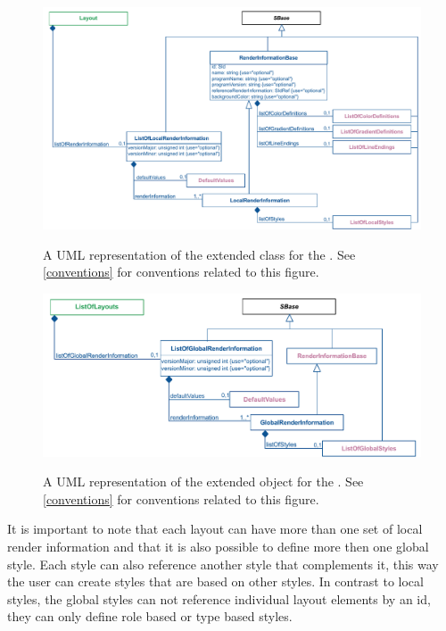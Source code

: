 \begin{figure}[h!]
  \centering
  \includegraphics[width=\textwidth]{images/render-layout-uml}\\
  \caption{A UML representation of the extended \Layout class for the \RenderPackage. See \ref{conventions} for conventions related to this figure.}
  \label{fig:Render_uml}
\end{figure}

\begin{figure}[h!]
  \centering
  \includegraphics[width=\textwidth]{images/render-listoflayout-uml}\\
  \caption{A UML representation of the extended \ListOfLayouts object for the \RenderPackage.  See \ref{conventions} for conventions related to this figure. }
  \label{fig:lol_render_uml}
\end{figure}

It is important to note that each layout can have more than one 
set of local render information and that it is 
also possible to define more then one global style. Each style can also 
reference another style that complements it, this way the user can create 
styles that are based on other styles. In contrast to local styles, the global styles can not 
reference individual layout elements by an id, they can only define role based or 
type based styles.

